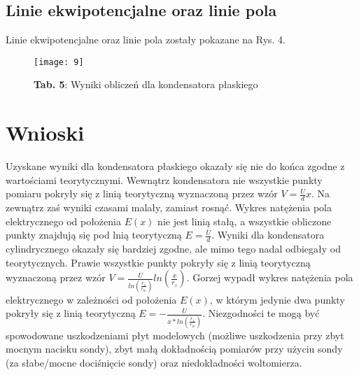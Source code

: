 \documentclass[12pt]{article}
\begin{document}
\subsection{Linie ekwipotencjalne oraz linie pola}
Linie ekwipotencjalne oraz linie pola zostały pokazane na Rys. 4.
\begin{figure}[H]
\centering
\texttt{[image: 9]}
\caption*{\textbf{Tab. 5}: Wyniki obliczeń dla kondensatora płaskiego}
\end{figure} 
\section{Wnioski}
Uzyskane wyniki dla kondensatora płaskiego okazały się nie do końca zgodne z wartościami teorytycznymi. Wewnątrz kondensatora nie wszystkie punkty pomiaru pokryły się z linią teorytyczną wyznaczoną przez wzór $V=\frac{U}{d}x$. Na zewnątrz zaś wyniki czasami malały, zamiast rosnąć. Wykres natężenia pola elektrycznego od położenia $E(x)$ nie jest linią stałą, a wszystkie obliczone punkty znajdują się pod lnią teorytyczną $E=\frac{U}{d}$. Wyniki dla kondensatora cylindrycznego okazały się bardziej zgodne, ale mimo tego nadal odbiegały od teorytycznych. Prawie wszystkie punkty pokryły się z linią teorytyczną wyznaczoną przez wzór $V=\frac{U}{ln(\frac{r_z}{r_w})}ln(\frac{x}{r_z})$. Gorzej wypadł wykres natężenia pola elektrycznego w zależności od położenia $E(x)$, w którym jedynie dwa punkty pokryły się z linią teorytyczną $E=-\frac{U}{x*ln(\frac{r_z}{r_w})}$. Niezgodności te mogą być spowodowane uszkodzeniami płyt modelowych (możliwe uszkodzenia przy zbyt mocnym nacisku sondy), zbyt małą dokładnością pomiarów przy użyciu sondy (za słabe/mocne dociśnięcie sondy) oraz niedokładności woltomierza.  
\end{document}
